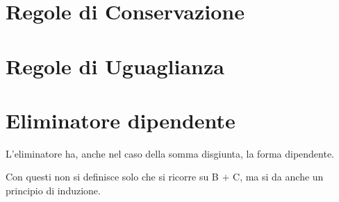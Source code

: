 \section{Regole di Conservazione}
\label{sec: conservazione-disjointsum}
\small
\begin{adjustwidth}{-5em}{}
\begin{prooftree}
\end{prooftree}
\end{adjustwidth}
\small
\begin{adjustwidth}{-5em}{}
\begin{prooftree}
\end{prooftree}
\end{adjustwidth}


\section{Regole di Uguaglianza}
\label{sec: uguaglianza-disjointsum}
\normalsize
\begin{prooftree}
\end{prooftree}

\section{Eliminatore dipendente}
\label{sec:eliminatore dipendente-disjointsum}
L'eliminatore ha, anche nel caso della somma disgiunta, la forma dipendente.
\small
\begin{adjustwidth}{-5em}{}
\begin{prooftree}
\end{prooftree}
\end{adjustwidth}
\noindent
\normalsize
Con questi non si definisce solo che si ricorre su B $+$ C, ma si da anche un principio di induzione.

